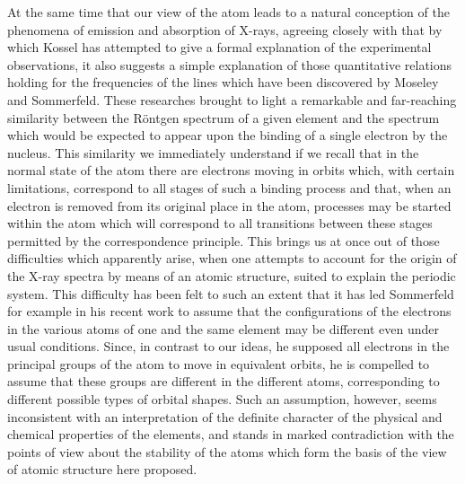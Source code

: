 At the same time that our view of the atom leads to a natural
conception of the phenomena of emission and absorption of X-rays,
agreeing closely with that by which Kossel has attempted to give
a formal explanation of the experimental observations, it also suggests
a simple explanation of those quantitative relations holding for the
frequencies of the lines which have been discovered by Moseley and
Sommerfeld. These researches brought to light a remarkable and
far-reaching similarity between the Röntgen spectrum of a given
element and the spectrum which would be expected to appear upon
the binding of a single electron by the nucleus. This similarity we
immediately understand if we recall that in the normal state of the
atom there are electrons moving in orbits which, with certain
limitations, correspond to all stages of such a binding process and
that, when an electron is removed from its original place in the
atom, processes may be started within the atom which will correspond
to all transitions between these stages permitted by the
correspondence principle. This brings us at once out of those
difficulties which apparently arise, when one attempts to account
for the origin of the X-ray spectra by means of an atomic structure,
suited to explain the periodic system. This difficulty has been felt
to such an extent that it has led Sommerfeld for example in his
recent work to assume that the configurations of the electrons in
the various atoms of one and the same element may be different
even under usual conditions. Since, in contrast to our ideas, he
supposed all electrons in the principal groups of the atom to move
in equivalent orbits, he is compelled to assume that these groups
are different in the different atoms, corresponding to different
possible types of orbital shapes. Such an assumption, however, seems
inconsistent with an interpretation of the definite character of the
physical and chemical properties of the elements, and stands in marked
contradiction with the points of view about the stability of the atoms
which form the basis of the view of atomic structure here proposed.

